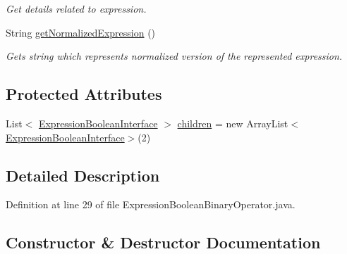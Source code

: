 \begin{DoxyCompactItemize}
\begin{DoxyCompactList}\small\item\em Get details related to expression. \end{DoxyCompactList}\item 
String \hyperlink{interfacegov_1_1nasa_1_1jpf_1_1inspector_1_1server_1_1expression_1_1_expression_node_interface_ae5387d8da0126c1256a786d54b9bd7ce}{get\+Normalized\+Expression} ()
\begin{DoxyCompactList}\small\item\em Gets string which represents normalized version of the represented expression. \end{DoxyCompactList}\end{DoxyCompactItemize}
\subsection*{Protected Attributes}
\begin{DoxyCompactItemize}
\item 
List$<$ \hyperlink{interfacegov_1_1nasa_1_1jpf_1_1inspector_1_1server_1_1expression_1_1_expression_boolean_interface}{Expression\+Boolean\+Interface} $>$ \hyperlink{classgov_1_1nasa_1_1jpf_1_1inspector_1_1server_1_1expression_1_1_expression_boolean_binary_operator_aa51f2a94e4b46898cc588a25f3957f6f}{children} = new Array\+List$<$\hyperlink{interfacegov_1_1nasa_1_1jpf_1_1inspector_1_1server_1_1expression_1_1_expression_boolean_interface}{Expression\+Boolean\+Interface}$>$(2)
\end{DoxyCompactItemize}


\subsection{Detailed Description}


Definition at line 29 of file Expression\+Boolean\+Binary\+Operator.\+java.



\subsection{Constructor \& Destructor Documentation}
